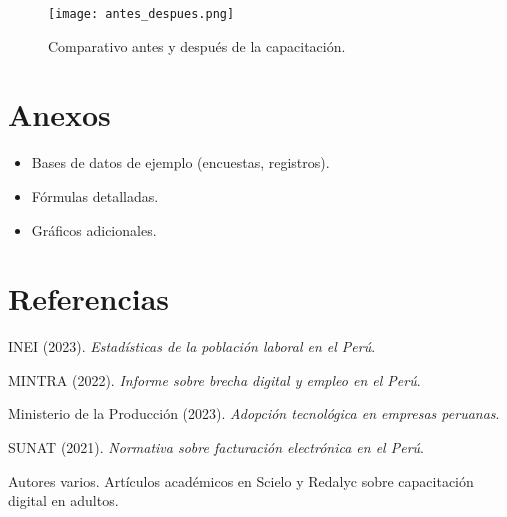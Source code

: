\documentclass[12pt,a4paper]{report}
\begin{document}
\begin{figure}[H]
    \centering
    \texttt{[image: antes\_despues.png]}
    \caption{Comparativo antes y después de la capacitación.}
\end{figure}

\chapter{Anexos}
\begin{itemize}
    \item Bases de datos de ejemplo (encuestas, registros).
    \item Fórmulas detalladas.
    \item Gráficos adicionales.
\end{itemize}

\chapter{Referencias}

\begin{thebibliography}{9}

INEI (2023). \textit{Estadísticas de la población laboral en el Perú}.

MINTRA (2022). \textit{Informe sobre brecha digital y empleo en el Perú}.

Ministerio de la Producción (2023). \textit{Adopción tecnológica en empresas peruanas}.

SUNAT (2021). \textit{Normativa sobre facturación electrónica en el Perú}.

Autores varios. Artículos académicos en Scielo y Redalyc sobre capacitación digital en adultos.

\end{thebibliography}
\end{document}
